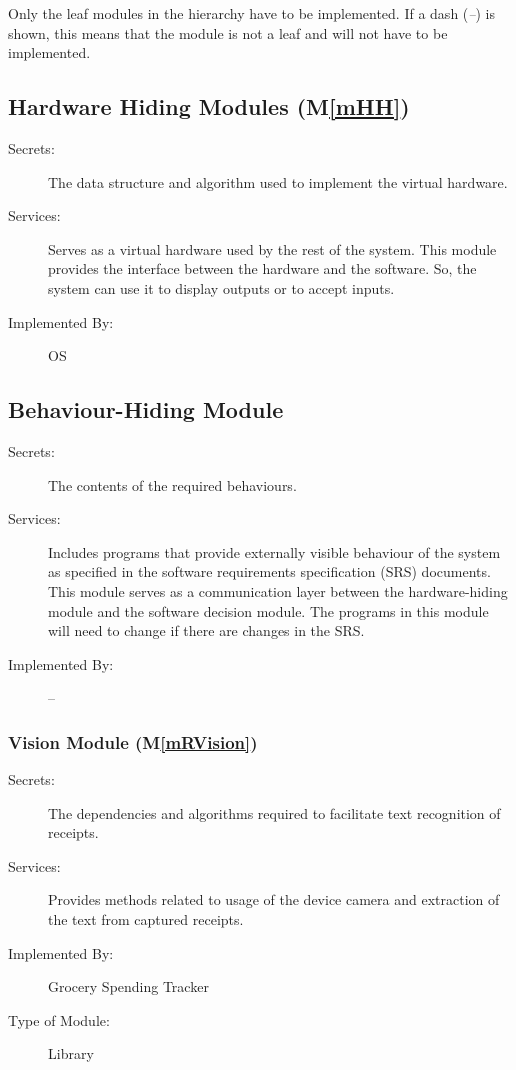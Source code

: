 \documentclass[12pt, titlepage]{article}
\newcommand{\mref}[1]{M\ref{#1}}
\begin{document}
Only the leaf modules in the hierarchy have to be implemented. If a dash
(\emph{--}) is shown, this means that the module is not a leaf and will not have
to be implemented.

\subsection{Hardware Hiding Modules (\mref{mHH})}

\begin{description}
\item[Secrets:]The data structure and algorithm used to implement the virtual
  hardware.
\item[Services:]Serves as a virtual hardware used by the rest of the
  system. This module provides the interface between the hardware and the
  software. So, the system can use it to display outputs or to accept inputs.
\item[Implemented By:] OS
\end{description}

\subsection{Behaviour-Hiding Module}

\begin{description}
\item[Secrets:]The contents of the required behaviours.
\item[Services:]Includes programs that provide externally visible behaviour of
  the system as specified in the software requirements specification (SRS)
  documents. This module serves as a communication layer between the
  hardware-hiding module and the software decision module. The programs in this
  module will need to change if there are changes in the SRS.
\item[Implemented By:] --
\end{description}

\subsubsection{Vision Module (\mref{mRVision})}

\begin{description}
\item[Secrets:] The dependencies and algorithms required to facilitate text recognition of receipts.
\item[Services:] Provides methods related to usage of the device camera and extraction of the text from captured
receipts.
\item[Implemented By:] Grocery Spending Tracker
\item[Type of Module:] Library
\end{description}
\end{document}
